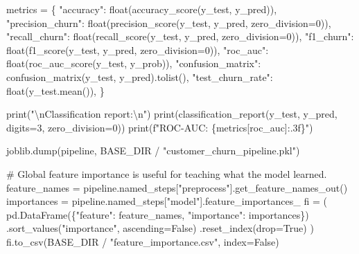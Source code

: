 \documentclass[
  indonesian,
  letterpaper,
  DIV=11,
  numbers=noendperiod]{scrreprt}
\newenvironment{Shaded}{\begin{snugshade}}{\end{snugshade}}
\newcommand{\BuiltInTok}[1]{\textcolor[rgb]{0.00,0.23,0.31}{#1}}
\newcommand{\CharTok}[1]{\textcolor[rgb]{0.13,0.47,0.30}{#1}}
\newcommand{\CommentTok}[1]{\textcolor[rgb]{0.37,0.37,0.37}{#1}}
\newcommand{\DecValTok}[1]{\textcolor[rgb]{0.68,0.00,0.00}{#1}}
\newcommand{\NormalTok}[1]{\textcolor[rgb]{0.00,0.23,0.31}{#1}}
\newcommand{\OperatorTok}[1]{\textcolor[rgb]{0.37,0.37,0.37}{#1}}
\newcommand{\SpecialCharTok}[1]{\textcolor[rgb]{0.37,0.37,0.37}{#1}}
\newcommand{\SpecialStringTok}[1]{\textcolor[rgb]{0.13,0.47,0.30}{#1}}
\newcommand{\StringTok}[1]{\textcolor[rgb]{0.13,0.47,0.30}{#1}}
\newcommand{\VariableTok}[1]{\textcolor[rgb]{0.07,0.07,0.07}{#1}}
\begin{document}
\begin{Shaded}
\begin{Highlighting}[]
\NormalTok{    metrics }\OperatorTok{=}\NormalTok{ \{}
        \StringTok{"accuracy"}\NormalTok{: }\BuiltInTok{float}\NormalTok{(accuracy\_score(y\_test, y\_pred)),}
        \StringTok{"precision\_churn"}\NormalTok{: }\BuiltInTok{float}\NormalTok{(precision\_score(y\_test, y\_pred, zero\_division}\OperatorTok{=}\DecValTok{0}\NormalTok{)),}
        \StringTok{"recall\_churn"}\NormalTok{: }\BuiltInTok{float}\NormalTok{(recall\_score(y\_test, y\_pred, zero\_division}\OperatorTok{=}\DecValTok{0}\NormalTok{)),}
        \StringTok{"f1\_churn"}\NormalTok{: }\BuiltInTok{float}\NormalTok{(f1\_score(y\_test, y\_pred, zero\_division}\OperatorTok{=}\DecValTok{0}\NormalTok{)),}
        \StringTok{"roc\_auc"}\NormalTok{: }\BuiltInTok{float}\NormalTok{(roc\_auc\_score(y\_test, y\_prob)),}
        \StringTok{"confusion\_matrix"}\NormalTok{: confusion\_matrix(y\_test, y\_pred).tolist(),}
        \StringTok{"test\_churn\_rate"}\NormalTok{: }\BuiltInTok{float}\NormalTok{(y\_test.mean()),}
\NormalTok{    \}}

    \BuiltInTok{print}\NormalTok{(}\StringTok{"}\CharTok{\textbackslash{}n}\StringTok{Classification report:}\CharTok{\textbackslash{}n}\StringTok{"}\NormalTok{)}
    \BuiltInTok{print}\NormalTok{(classification\_report(y\_test, y\_pred, digits}\OperatorTok{=}\DecValTok{3}\NormalTok{, zero\_division}\OperatorTok{=}\DecValTok{0}\NormalTok{))}
    \BuiltInTok{print}\NormalTok{(}\SpecialStringTok{f"ROC{-}AUC: }\SpecialCharTok{\{}\NormalTok{metrics[}\StringTok{\textquotesingle{}roc\_auc\textquotesingle{}}\NormalTok{]}\SpecialCharTok{:.3f\}}\SpecialStringTok{"}\NormalTok{)}

\NormalTok{    joblib.dump(pipeline, BASE\_DIR }\OperatorTok{/} \StringTok{"customer\_churn\_pipeline.pkl"}\NormalTok{)}

    \CommentTok{\# Global feature importance is useful for teaching what the model learned.}
\NormalTok{    feature\_names }\OperatorTok{=}\NormalTok{ pipeline.named\_steps[}\StringTok{"preprocess"}\NormalTok{].get\_feature\_names\_out()}
\NormalTok{    importances }\OperatorTok{=}\NormalTok{ pipeline.named\_steps[}\StringTok{"model"}\NormalTok{].feature\_importances\_}
\NormalTok{    fi }\OperatorTok{=}\NormalTok{ (}
\NormalTok{        pd.DataFrame(\{}\StringTok{"feature"}\NormalTok{: feature\_names, }\StringTok{"importance"}\NormalTok{: importances\})}
\NormalTok{        .sort\_values(}\StringTok{"importance"}\NormalTok{, ascending}\OperatorTok{=}\VariableTok{False}\NormalTok{)}
\NormalTok{        .reset\_index(drop}\OperatorTok{=}\VariableTok{True}\NormalTok{)}
\NormalTok{    )}
\NormalTok{    fi.to\_csv(BASE\_DIR }\OperatorTok{/} \StringTok{"feature\_importance.csv"}\NormalTok{, index}\OperatorTok{=}\VariableTok{False}\NormalTok{)}


\end{Highlighting}
\end{Shaded}
\end{document}
